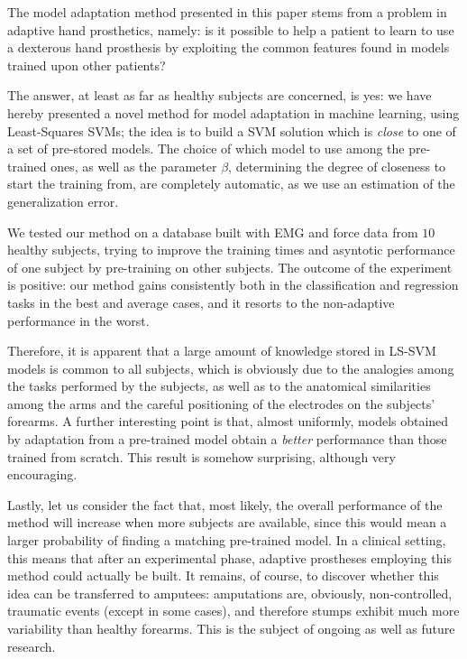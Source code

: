 The model adaptation method presented in this paper stems from a
problem in adaptive hand prosthetics, namely: is it possible to help a
patient to learn to use a dexterous hand prosthesis 
by exploiting the common features found in models trained upon other
patients?

The answer, at least as far as healthy subjects are concerned, is yes:
we have hereby presented a novel method for model adaptation in
machine learning, using Least-Squares SVMs; the idea is to build a SVM
solution which is \emph{close} to one of a set of pre-stored
models. The choice of which model to use among the pre-trained ones,
as well as the parameter $\beta$, determining the degree of closeness
to start the training from, are completely automatic, as we use an
estimation of the generalization error.

We tested our method on a database built with EMG and force data from
$10$ healthy subjects, trying to improve the training times and
asyntotic performance of one subject by pre-training on other
subjects. The outcome of the experiment is positive: our method gains
consistently both in the classification and regression tasks in the
best and average cases, and it resorts to the non-adaptive performance
in the worst.

Therefore, it is apparent that a large amount of knowledge stored in
LS-SVM models is common to all subjects, which is obviously due to the
analogies among the tasks performed by the subjects, as well as to the
anatomical similarities among the arms and the careful positioning of
the electrodes on the subjects' forearms. A further interesting point
is that, almost uniformly, models obtained by adaptation from a
pre-trained model obtain a \emph{better} performance than those
trained from scratch. This result is somehow surprising, although very
encouraging.

Lastly, let us consider the fact that, most likely, the overall
performance of the method will increase when more subjects are
available, since this would mean a larger probability of finding a
matching pre-trained model. In a clinical setting, this means that
after an experimental phase, adaptive prostheses employing this method
could actually be built. It remains, of course, to discover whether
this idea can be transferred to amputees: amputations are, obviously,
non-controlled, traumatic events (except in some cases), and therefore
stumps exhibit much more variability than healthy forearms. This is
the subject of ongoing as well as future research.
